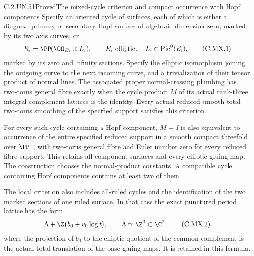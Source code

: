\begin{statement}{C.2.UN.51}{Proved}{The mixed-cycle criterion and compact occurrence with Hopf components}
Specify an oriented cycle of surfaces, each of which is either
a diagonal primary or secondary Hopf surface of algebraic dimension
zero, marked by its two axis curves, or
\[
                  R_i=\PP(\OO_{E_i}\oplus L_i),
                  \qquad E_i\ \hbox{elliptic},\quad
                         L_i\in\operatorname{Pic}^0(E_i),
                                                        \tag{C.MX.1}
\]
marked by its zero and infinity sections. Specify the elliptic
isomorphism joining the outgoing curve to the next incoming curve,
and a trivialization of their tensor product of normal lines.
The associated proper normal-crossing plumbing has two-torus
general fibre exactly when the cycle product $M$ of its actual
rank-three integral complement lattices is the identity.
Every actual reduced smooth-total two-torus smoothing of the
specified support satisfies this criterion.

For every such cycle containing a Hopf component, $M=I$ is also
equivalent to occurrence of the entire specified reduced support
in a smooth compact threefold over $\PP^1$, with two-torus
general fibre and Euler number zero for every reduced fibre
support. This retains all component surfaces and every elliptic
gluing map. The construction chooses the normal-product constants.
A compatible cycle containing Hopf components contains at least
two of them.

The local criterion also includes all-ruled cycles and the
identification of the two marked sections of one ruled surface.
In that case the exact punctured period lattice has the form
\[
                 \Lambda+\Z\bigl(b_0+v_0\log t\bigr),
           \qquad \Lambda\simeq\Z^3\subset\C^2,          \tag{C.MX.2}
\]
where the projection of $b_0$ to the elliptic quotient of the
common complement is the actual total translation of the base
gluing maps. It is retained in this formula.
\end{statement}

